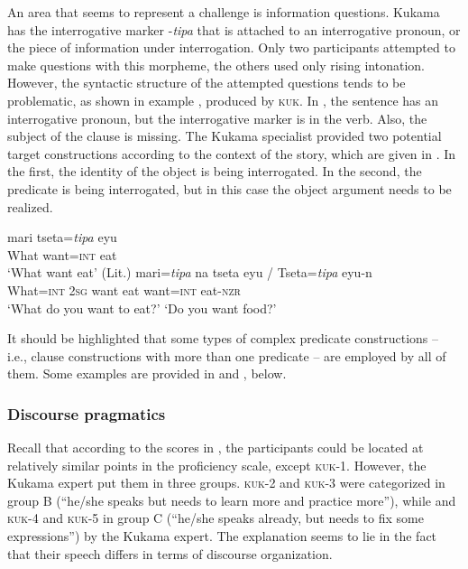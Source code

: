\documentclass[output=paper]{langscibook}
\begin{document}
An area that seems to represent a challenge is information questions. Kukama has the interrogative marker -\textit{tipa} that is attached to an interrogative pronoun, or the piece of information under interrogation. Only two participants attempted to make questions with this morpheme, the others used only rising intonation. However, the syntactic structure of the attempted questions tends to be problematic, as shown in example , produced by \textsc{kuk}. In , the sentence has an interrogative pronoun, but the interrogative marker is in the verb. Also, the subject of the clause is missing. The Kukama specialist provided two potential target constructions according to the context of the story, which are given in . %
In the first, the identity of the object is being interrogated. In the second, the predicate is being interrogated, but in this case the object argument needs to be realized.

\ea
  \ea\label{ex:7:2a}
  \gll  mari   tseta=\textit{tipa} eyu\\
  What  want=\textsc{int}  eat\\
  \glt ‘What want eat’ (Lit.)
  \ex\label{ex:7:2b}
  \gll mari=\textit{tipa} na   tseta   eyu   /   Tseta=\textit{tipa} eyu-n\\
  What=\textsc{int}  \textsc{2sg}  want   eat {}   want=\textsc{int}  eat-\textsc{nzr}\\
  \glt ‘What do you want to eat?’      ‘Do you want food?’
  \z
\z

It should be highlighted that some types of complex predicate constructions -- i.e., clause constructions with more than one predicate -- are employed by all of them. Some examples are provided in  and , below.


\subsubsection{Discourse pragmatics}
Recall that according to the scores in , the participants could be located at relatively similar points in the proficiency scale, except {\textsc{kuk}}{{}-1. However, the Kukama expert put them in three groups.} {\textsc{kuk}}{{}-2 and} {\textsc{kuk}}{{}-3 were categorized in group B (“he/she speaks but needs to learn more and practice more”), while and} {\textsc{kuk}}{{}-4 and} {\textsc{kuk}}{{}-5 in group C (“he/she speaks already, but needs to fix some expressions”) by the Kukama expert. The explanation seems to lie in the fact that their speech differs in terms of discourse organization.}
\end{document}
